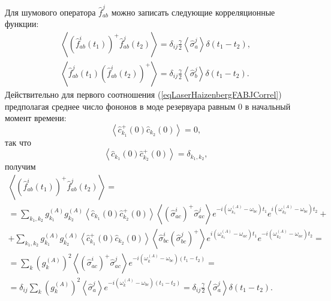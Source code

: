 Для шумового оператора $\hat{f}_{ab}^{j}$ можно записать следующие
корреляционные функции:
\begin{eqnarray}
\left<\left(\hat{f}_{ab}^{i}\left(t_1\right)\right)^{+}\hat{f}_{ab}^{j}\left(t_2\right)\right>
= \delta_{ij}
\frac{\gamma}{2}\left<\hat{\sigma}^{j}_{a}\right>\delta\left(t_1 -
t_2\right),
\nonumber \\
\left<\hat{f}_{ab}^{j}\left(t_1\right)\left(\hat{f}_{ab}^{i}\left(t_2\right)\right)^{+}\right>
= \delta_{ij}
\frac{\gamma}{2}\left<\hat{\sigma}^{j}_{b}\right>\delta\left(t_1 -
t_2\right).
\label{eqLaserHaizenbergFABJCorrel}
\end{eqnarray}
Действительно для первого соотношения
(\ref{eqLaserHaizenbergFABJCorrel}) предполагая среднее число фононов
в моде резервуара равным $0$ в начальный момент времени:
\begin{equation}
\left<\hat{c}_{k_1}^{+}\left(0\right)\hat{c}_{k_2}\left(0\right)\right>
= 0,
\nonumber
\end{equation}
так что
\begin{equation}
\left<\hat{c}_{k_1}\left(0\right)\hat{c}_{k_2}^{+}\left(0\right)\right>
= \delta_{k_1,k_2},
\nonumber
\end{equation}
получим
\begin{eqnarray}
\left<\left(\hat{f}_{ab}^{i}\left(t_1\right)\right)^{+}\hat{f}_{ab}^{j}\left(t_2\right)\right>
= 
\nonumber \\
=
\sum_{k_1,k_2}
g_{k_1}^{(A)}g_{k_2}^{(A)}
\left<\hat{c}_{k_1}\left(0\right)\hat{c}_{k_2}^{+}\left(0\right)\right>
\left<\left(\hat{\sigma}^{i}_{ac}\right)^{+}\hat{\sigma}^{j}_{ac}\right>  
e^{- i\left(\omega_{k_1}^{(A)} - \omega_{bc}\right)t_1}
e^{i\left(\omega_{k_2}^{(A)} - \omega_{bc}\right)t_2} +
\nonumber \\
+
\sum_{k_1,k_2}
g_{k_1}^{(A)}g_{k_2}^{(A)}
\left<\hat{c}_{k_1}^{+}\left(0\right)\hat{c}_{k_2}\left(0\right)\right>
\left<\hat{\sigma}^{i}_{bc}\left(\hat{\sigma}^{j}_{bc}\right)^{+}\right>
e^{i\left(\omega_{k_1}^{(A)} -
  \omega_{ac}\right)t_1}e^{-i\left(\omega_{k_2}^{(A)} -
  \omega_{ac}\right)t_2} = 
\nonumber \\
= 
\sum_{k}
\left(g_{k}^{(A)}\right)^2
\left<\left(\hat{\sigma}^{i}_{ac}\right)^{+}\hat{\sigma}^{j}_{ac}\right>  
e^{- i\left(\omega_{k}^{(A)} - \omega_{bc}\right)\left(t_1 -
  t_2\right)} = 
\nonumber \\
=
\delta_{ij}
\sum_{k}
\left(g_{k}^{(A)}\right)^2 
\left<\hat{\sigma}^{j}_{a}\right>  
e^{- i\left(\omega_{k}^{(A)} - \omega_{bc}\right)\left(t_1 -
  t_2\right)} = 
\delta_{ij}
\frac{\gamma}{2}\left<\hat{\sigma}^{j}_{a}\right>\delta\left(t_1 - t_2\right).
\nonumber
\end{eqnarray}


